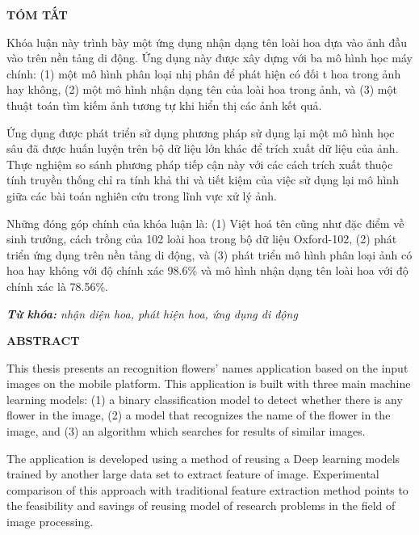 \documentclass[12pt]{report}
\begin{document}
		\newpage
		\begin{center}
			\textbf{\large TÓM TẮT}
		\end{center}
																																			
		Khóa luận này trình bày một ứng dụng nhận dạng tên loài hoa dựa vào ảnh đầu vào trên nền tảng di động. Ứng dụng này được xây dựng với ba mô hình học máy chính: (1) một mô hình phân loại nhị phân để phát hiện có đối t hoa trong ảnh hay không, (2) một mô hình nhận dạng tên của loài hoa trong ảnh, và (3) một thuật toán tìm kiếm ảnh tương tự khi hiển thị các ảnh kết quả. 
																	
		Ứng dụng được phát triển sử dụng phương pháp sử dụng lại một mô hình học sâu đã được huấn luyện trên bộ dữ liệu lớn khác để trích xuất dữ liệu của ảnh. Thực nghiệm so sánh phương pháp tiếp cận này với các cách trích xuất thuộc tính truyền thống chỉ ra tính khả thi và tiết kiệm của việc sử dụng lại mô hình giữa các bài toán nghiên cứu trong lĩnh vực xử lý ảnh.
																	
		Những đóng góp chính của khóa luận là: (1) Việt hoá tên cũng như đặc điểm về sinh trưởng, cách trồng của 102 loài hoa trong bộ dữ liệu Oxford-102, (2) phát triển ứng dụng trên nền tảng di động, và (3) phát triển mô hình phân loại ảnh có hoa hay không với độ chính xác 98.6\% và mô hình nhận dạng tên loài hoa với độ chính xác là 78.56\%.																			
																																																																										
		\noindent \textit{\textbf{Từ khóa:} nhận diện hoa, phát hiện hoa, ứng dụng di động}
																																																																										
		\newpage
		\begin{center}
			\textbf{\large ABSTRACT}
		\end{center}
																																																																										
		This thesis presents an recognition flowers’ names application based on the input images on the mobile platform. This application is built with three main machine learning models: (1) a binary classification model to detect whether there is any flower in the image, (2) a model that recognizes the name of the flower in the image, and (3) an algorithm which searches for results of similar images. 
																																																																										
		The application is developed using a method of reusing a Deep learning models trained by another large data set to extract feature of image. Experimental comparison of this approach with traditional feature extraction method points to the feasibility and savings of reusing model of research problems in the field of image processing.
																																																																										
\end{document}
